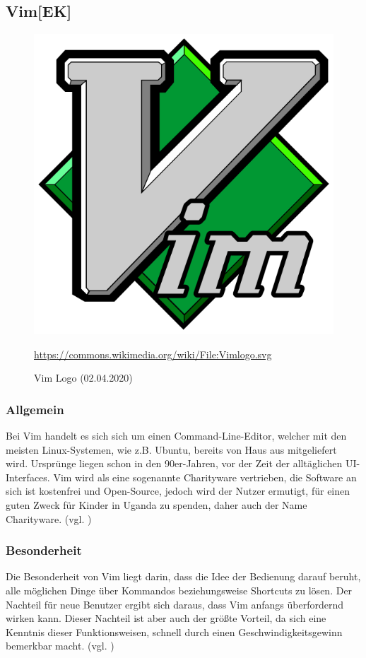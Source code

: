 \subsection{Vim[EK]}
\begin{figure}[H]
\centering
  \includegraphics[scale=0.2]{images/vim-logo.png}
  \caption{Vim Logo (02.04.2020)}
  \url{https://commons.wikimedia.org/wiki/File:Vimlogo.svg}
\end{figure}
\subsubsection{Allgemein}
Bei Vim handelt es sich sich um einen Command-Line-Editor, welcher mit den meisten Linux-Systemen, wie z.B. Ubuntu, bereits von Haus aus mitgeliefert wird. Ursprünge liegen schon in den 90er-Jahren, vor der Zeit der alltäglichen UI-Interfaces. Vim wird als eine sogenannte Charityware vertrieben, die Software an sich ist kostenfrei und Open-Source, jedoch wird der Nutzer ermutigt, für einen guten Zweck für Kinder in Uganda zu spenden, daher auch der Name Charityware.
(vgl. \cite{Vim-Background})
\subsubsection{Besonderheit}
Die Besonderheit von Vim liegt darin, dass die Idee der Bedienung darauf beruht, alle möglichen Dinge über Kommandos beziehungsweise Shortcuts zu lösen. Der Nachteil für neue Benutzer ergibt sich daraus, dass Vim anfangs überfordernd wirken kann. Dieser Nachteil ist aber auch der größte Vorteil, da sich eine Kenntnis dieser Funktionsweisen, schnell durch einen Geschwindigkeitsgewinn bemerkbar macht.
(vgl. \cite{Vim-Besonderheit})

